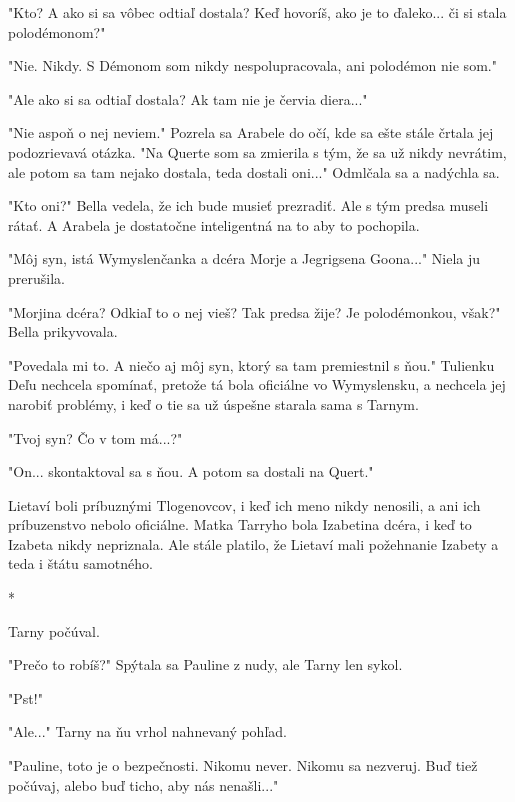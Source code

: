 \documentclass{book}
\begin{document}
"$ $Kto? A ako si sa vôbec odtiaľ dostala? Keď hovoríš, ako je to ďaleko... či si stala polodémonom?"$ $ 

"$ $Nie. Nikdy. S Démonom som nikdy nespolupracovala, ani polodémon nie som."$ $ 

"$ $Ale ako si sa odtiaľ dostala? Ak tam nie je červia diera..."$ $ 

"$ $Nie aspoň o nej neviem."$ $  Pozrela sa Arabele do očí, kde sa ešte stále črtala jej podozrievavá otázka. "$ $Na Querte som sa zmierila s tým, že sa už nikdy nevrátim, ale potom sa tam nejako dostala, teda dostali oni..."$ $  Odmlčala sa a nadýchla sa.

"$ $Kto oni?"$ $  Bella vedela, že ich bude musieť prezradiť. Ale s tým predsa museli rátať. A Arabela je dostatočne inteligentná na to aby to pochopila.

"$ $Môj syn, istá Wymyslenčanka a dcéra Morje a Jegrigsena Goona..."$ $  Niela ju prerušila.

"$ $Morjina dcéra? Odkiaľ to o nej vieš? Tak predsa žije? Je polodémonkou, však?"$ $  Bella prikyvovala.

"$ $Povedala mi to. A niečo aj môj syn, ktorý sa tam premiestnil s ňou."$ $  Tulienku Deľu nechcela spomínať, pretože tá bola oficiálne vo Wymyslensku, a nechcela jej narobiť problémy, i keď o tie sa už úspešne starala sama s Tarnym.

"$ $Tvoj syn? Čo v tom má...?"$ $ 

"$ $On... skontaktoval sa s ňou. A potom sa dostali na Quert."$ $ 

Lietaví boli príbuznými Tlogenovcov, i keď ich meno nikdy nenosili, a ani ich príbuzenstvo nebolo oficiálne. Matka Tarryho bola Izabetina dcéra, i keď to Izabeta nikdy nepriznala. Ale stále platilo, že Lietaví mali požehnanie Izabety a teda i štátu samotného.

\begin{center}

*

\end{center}

Tarny počúval.

"$ $Prečo to robíš?"$ $  Spýtala sa Pauline z nudy, ale Tarny len sykol.

"$ $Pst!"$ $ 

"$ $Ale..."$ $  Tarny na ňu vrhol nahnevaný pohľad.

"$ $Pauline, toto je o bezpečnosti. Nikomu never. Nikomu sa nezveruj. Buď tiež počúvaj, alebo buď ticho, aby nás nenašli..."$ $ 
\end{document}

